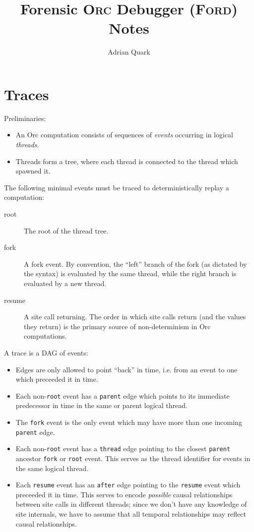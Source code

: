 \documentclass{article}[12pt]
\begin{document}
\title{Forensic \textsc{Orc} Debugger (\textsc{Ford}) Notes}\author{Adrian Quark}\maketitle

\section{Traces}

Preliminaries:
\begin{itemize}
\item An Orc computation consists of sequences of {\em events} occurring in
logical {\em threads}.
\item Threads form a tree, where each thread is connected to the thread which
spawned it.
\end{itemize}

The following minimal events must be traced to deterministically replay a computation:
\begin{description}
\item[root] The root of the thread tree.
\item[fork] A fork event. By convention, the ``left'' branch of the fork (as
dictated by the syntax) is evaluated by the same thread, while the right branch
is evaluated by a new thread.
\item[resume] A site call returning. The order in which site calls return (and
the values they return) is the primary source of non-determinism in Orc
computations.
\end{description}

A trace is a DAG of events:
\begin{itemize}
\item Edges are only allowed to point ``back'' in time, i.e. from an event to
one which preceeded it in time.
\item Each non-\texttt{root} event has a \texttt{parent} edge which
points to its immediate predecessor in time in the same or parent logical
thread.
\item The \texttt{fork} event is the only event which may have more than one
incoming \texttt{parent} edge.
\item Each non-\texttt{root} event has a \texttt{thread} edge pointing to the
closest \texttt{parent} ancestor \texttt{fork} or \texttt{root} event. This
serves as the thread identifier for events in the same logical thread.
\item Each \texttt{resume} event has an \texttt{after} edge pointing to the
\texttt{resume} event which preceeded it in time. This serves to encode {\em
possible} causal relationships between site calls in different threads; since
we don't have any knowledge of site internals, we have to assume that all
temporal relationships may reflect causal relationships.
\end{itemize}
\end{document}
